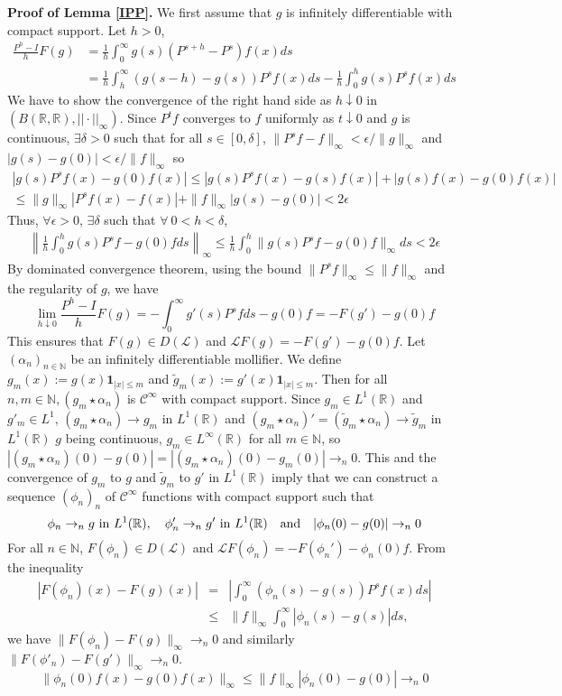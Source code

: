 \documentclass[a4paper, 11pt]{article}
\newcommand{\N}{\mathbb{N}}
\newcommand{\R}{\mathbb{R}}
\newcommand{\1}{\mathbf{1}}
\begin{document}
\noindent\textbf{Proof of Lemma \ref{IPP}.}
We first assume that $g$ is infinitely differentiable with compact support. Let $h>0$,
\begin{align*}
\frac{P^h-I}{h}F(g)&=\frac{1}{h}\int_0^\infty g(s)(P^{s+h}-P^s)f(x)ds\\
&=\frac{1}{h}\int_h^\infty (g(s-h)-g(s))P^sf(x)ds-\frac{1}{h}\int_0^hg(s)P^sf(x)ds
\end{align*}
We have to show the convergence of the right hand side as $h\downarrow 0$ in \\$(B(\R,\R), {||\cdot||_\infty})$. Since $P^tf$ converges to $f$ uniformly as $t\downarrow 0$ and $g$ is continuous, $\exists \delta>0$ such that for all $s\in [0,\delta]$, $\| P^sf-f\|_\infty<\epsilon/\|g\|_\infty$ and $|g(s)-g(0)|<\epsilon/\|f\|_\infty$ so
\begin{multline*}
|g(s)P^sf(x)-g(0)f(x)|\leq |g(s)P^sf(x)-g(s)f(x)|+|g(s)f(x)-g(0)f(x)|\\
\leq \|g\|_\infty |P^sf(x)-f(x)|+\| f\|_\infty |g(s)-g(0)|<2\epsilon
\end{multline*}
Thus, $\forall \epsilon>0$, $\exists \delta$ such that $\forall\ 0<h<\delta$,
\begin{align*}
\left\| \frac{1}{h}\int_0^h g(s)P^sf-g(0)fds \right\|_\infty \leq \frac{1}{h}\int_0^h \|g(s)P^sf-g(0)f\|_\infty ds<2\epsilon
\end{align*}
By dominated convergence theorem, using the bound $\|P^sf\|_\infty\leq \|f\|_\infty$ and the regularity of $g$, we have
$$\lim_{h\downarrow 0} \frac{P^h-I}{h}F(g)=-\int_0^\infty g'(s)P^sfds-g(0)f=-F(g')-g(0)f$$
This ensures that $F(g)\in D(\mathcal{L})$ and $\mathcal{L}F(g)=-F(g')-g(0)f$. Let $(\alpha_n)_{n\in \N}$ be an infinitely differentiable mollifier. We define $g_m(x):=g(x)\1_{|x|\leq m}$ and $\tilde{g}_m(x):=g'(x)\1_{|x|\leq m}$. Then for all $n,m\in \N, (g_m \star \alpha_n)$ is $\mathcal{C}^\infty$ with compact support. Since $g_m\in L^1(\R)$ and $g'_m\in L^1$, $(g_m\star \alpha_n)\rightarrow g_m$ in $L^1(\R)$ and $(g_m\star \alpha_n)'=(\tilde{g}_m\star \alpha_n)\rightarrow \tilde{g}_m$ in $L^1(\R)$
$g$ being continuous, $g_m\in L^\infty(\R)$ for all $m\in \N$, so $|(g_m\star \alpha_n)(0)-g(0)|=|(g_m\star \alpha_n)(0)-g_m(0)|\rightarrow_n 0$. This and the convergence of $g_m$ to $g$ and $\tilde{g}_m$ to $g'$ in $L^1(\R)$ imply that we can construct a sequence $(\phi_n)_n$ of $\mathcal{C}^\infty$ functions with compact support such that
$$\phi_n\rightarrow_n g \text{\ in\ } L^1(\R),\quad  \phi'_n\rightarrow_n g'  \text{\ in\ } L^1(\R) \text{\quad and\quad}|\phi_n(0)-g(0)| \rightarrow_n 0$$
For all $n\in \N$, $F(\phi_n)\in D(\mathcal{L})$ and $\mathcal{L}F(\phi_n)=-F(\phi_n')-\phi_n(0)f$.
From the inequality
\begin{eqnarray*}
|F(\phi_n)(x)-F(g)(x)|&=&\left| \int_0^\infty (\phi_n(s)-g(s))P^sf(x)ds\right|\\
&\leq& \|f\|_\infty \int_0^\infty |\phi_n(s)-g(s)|ds,
\end{eqnarray*}
we have $\|F(\phi_n)-F(g)\|_\infty\rightarrow_n 0$ and similarly $\|F(\phi'_n)-F(g')\|_\infty\rightarrow_n 0$.
$$\|\phi_n(0)f(x)-g(0)f(x)\|_\infty \leq \|f\|_\infty |\phi_n(0)-g(0)|\rightarrow_n 0$$
\end{document}
